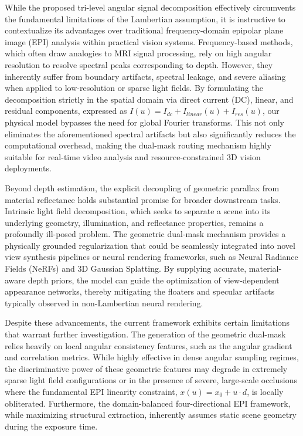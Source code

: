 \documentclass[lettersize,journal]{IEEEtran}
\begin{document}
While the proposed tri-level angular signal decomposition effectively circumvents the fundamental limitations of the Lambertian assumption, it is instructive to contextualize its advantages over traditional frequency-domain epipolar plane image (EPI) analysis within practical vision systems. Frequency-based methods, which often draw analogies to MRI signal processing, rely on high angular resolution to resolve spectral peaks corresponding to depth. However, they inherently suffer from boundary artifacts, spectral leakage, and severe aliasing when applied to low-resolution or sparse light fields. By formulating the decomposition strictly in the spatial domain via direct current (DC), linear, and residual components, expressed as $I(u) = I_{dc} + I_{linear}(u) + I_{res}(u)$, our physical model bypasses the need for global Fourier transforms. This not only eliminates the aforementioned spectral artifacts but also significantly reduces the computational overhead, making the dual-mask routing mechanism highly suitable for real-time video analysis and resource-constrained 3D vision deployments.

Beyond depth estimation, the explicit decoupling of geometric parallax from material reflectance holds substantial promise for broader downstream tasks. Intrinsic light field decomposition, which seeks to separate a scene into its underlying geometry, illumination, and reflectance properties, remains a profoundly ill-posed problem. The geometric dual-mask mechanism provides a physically grounded regularization that could be seamlessly integrated into novel view synthesis pipelines or neural rendering frameworks, such as Neural Radiance Fields (NeRFs) and 3D Gaussian Splatting. By supplying accurate, material-aware depth priors, the model can guide the optimization of view-dependent appearance networks, thereby mitigating the floaters and specular artifacts typically observed in non-Lambertian neural rendering.

Despite these advancements, the current framework exhibits certain limitations that warrant further investigation. The generation of the geometric dual-mask relies heavily on local angular consistency features, such as the angular gradient and correlation metrics. While highly effective in dense angular sampling regimes, the discriminative power of these geometric features may degrade in extremely sparse light field configurations or in the presence of severe, large-scale occlusions where the fundamental EPI linearity constraint, $x(u) = x_0 + u \cdot d$, is locally obliterated. Furthermore, the domain-balanced four-directional EPI framework, while maximizing structural extraction, inherently assumes static scene geometry during the exposure time. 
\end{document}
